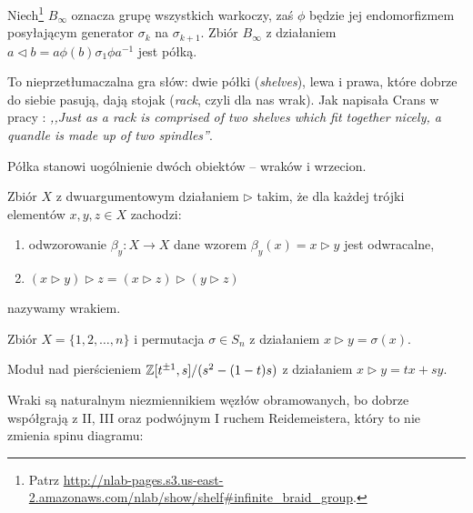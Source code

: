 \begin{example}
%
    Niech\footnote{Patrz \url{http://nlab-pages.s3.us-east-2.amazonaws.com/nlab/show/shelf\#infinite_braid_group}.} $B_\infty$ oznacza grupę wszystkich warkoczy, zaś $\phi$ będzie jej endomorfizmem posyłającym generator $\sigma_k$ na $\sigma_{k+1}$.
    Zbiór $B_\infty$ z działaniem $a \triangleleft b = a\phi(b)\sigma_1 \phi{a} ^{-1}$ jest półką.
\end{example}

To nieprzetłumaczalna gra słów: dwie półki (\emph{shelves}), lewa i prawa, które dobrze do siebie pasują, dają stojak (\emph{rack}, czyli dla nas wrak).
Jak napisała Crans w pracy \cite[s. 86]{crans04}: \emph{,,Just as a rack is comprised of two shelves which fit together nicely, a quandle is made up of two spindles''}.
%

Półka stanowi uogólnienie dwóch obiektów -- wraków i wrzecion.

\begin{definition}[wrak]
%
    Zbiór $X$ z dwuargumentowym działaniem $\triangleright$ takim, że dla każdej trójki elementów $x, y, z \in X$ zachodzi:
    \begin{enumerate}
        \item odwzorowanie $\beta_y \colon X \to X$ dane wzorem $\beta_y(x) = x \triangleright y$ jest odwracalne,
        \item $(x \triangleright y) \triangleright z = (x \triangleright z) \triangleright (y \triangleright z)$
    \end{enumerate}
    nazywamy wrakiem.
\end{definition}

\begin{example}
    Zbiór $X = \{1, 2, \ldots, n\}$ i permutacja $\sigma \in S_n$ z działaniem $x \triangleright y = \sigma(x)$.
\end{example}

\begin{example}
    Moduł nad pierścieniem $\mathbb Z[t^{\pm 1}, s]/(s^2 - (1-t)s)$ z działaniem $x \triangleright y = tx+sy$.
\end{example}

Wraki są naturalnym niezmiennikiem węzłów obramowanych, bo dobrze współgrają z II, III oraz podwójnym I ruchem Reidemeistera, który to nie zmienia spinu diagramu:
\begin{comment}
\[
    \LargeReidemeisterOneLeftRightQuandleProof
    \cong
    \LargeReidemeisterOneStraightQuandleProofRotated
\]
\end{comment}

